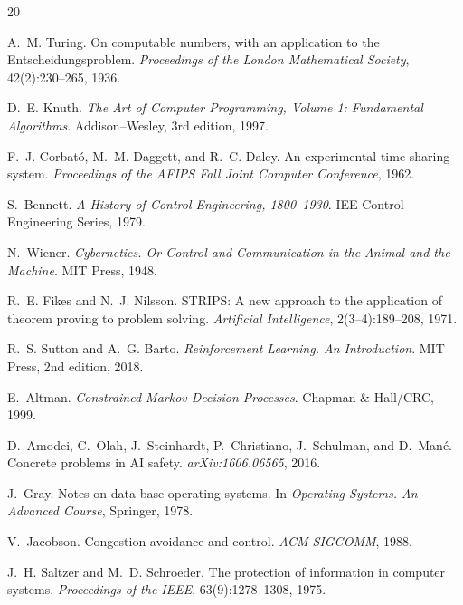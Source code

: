 \documentclass[11pt]{book}
\begin{document}
\begin{thebibliography}{20}

A.~M. Turing.
\newblock On computable numbers, with an application to the Entscheidungsproblem.
\newblock \emph{Proceedings of the London Mathematical Society}, 42(2):230--265,
1936.

D.~E. Knuth.
\newblock \emph{The Art of Computer Programming, Volume 1: Fundamental Algorithms}.
\newblock Addison--Wesley, 3rd edition, 1997.

F.~J. Corbató, M.~M. Daggett, and R.~C. Daley.
\newblock An experimental time-sharing system.
\newblock \emph{Proceedings of the AFIPS Fall Joint Computer Conference}, 1962.

S.~Bennett.
\newblock \emph{A History of Control Engineering, 1800--1930}.
\newblock IEE Control Engineering Series, 1979.

N.~Wiener.
\newblock \emph{Cybernetics. Or Control and Communication in the Animal and the
Machine}.
\newblock MIT Press, 1948.

R.~E. Fikes and N.~J. Nilsson.
\newblock STRIPS: A new approach to the application of theorem proving to problem
solving.
\newblock \emph{Artificial Intelligence}, 2(3--4):189--208, 1971.

R.~S. Sutton and A.~G. Barto.
\newblock \emph{Reinforcement Learning. An Introduction}.
\newblock MIT Press, 2nd edition, 2018.

E.~Altman.
\newblock \emph{Constrained Markov Decision Processes}.
\newblock Chapman \& Hall/CRC, 1999.

D.~Amodei, C.~Olah, J.~Steinhardt, P.~Christiano, J.~Schulman, and D.~Mané.
\newblock Concrete problems in AI safety.
\newblock \emph{arXiv:1606.06565}, 2016.

J.~Gray.
\newblock Notes on data base operating systems.
\newblock In \emph{Operating Systems. An Advanced Course}, Springer, 1978.

V.~Jacobson.
\newblock Congestion avoidance and control.
\newblock \emph{ACM SIGCOMM}, 1988.

J.~H. Saltzer and M.~D. Schroeder.
\newblock The protection of information in computer systems.
\newblock \emph{Proceedings of the IEEE}, 63(9):1278--1308, 1975.



\end{thebibliography}
\end{document}
